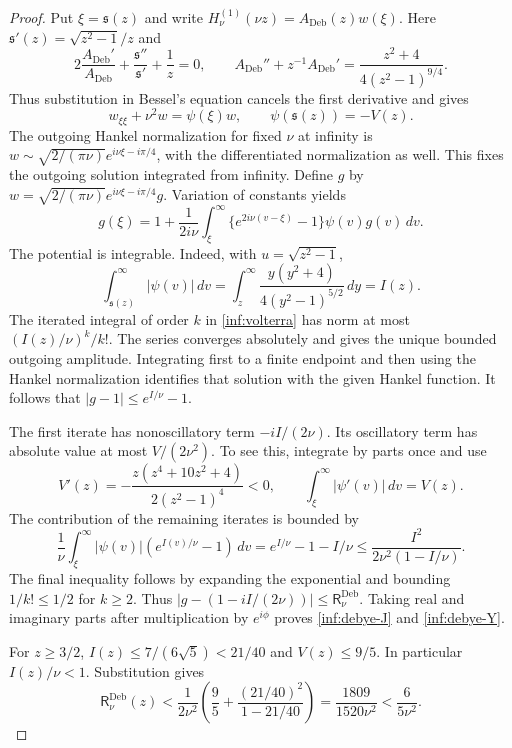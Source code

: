 \begin{proof}
Put $\xi=\mathfrak s(z)$ and write
$H_\nu^{(1)}(\nu z)=A_{\mathrm{Deb}}(z)w(\xi)$.
Here $\mathfrak s'(z)=\sqrt{z^2-1}/z$ and
\[
 2\frac{A_{\mathrm{Deb}}'}{A_{\mathrm{Deb}}}
 +\frac{\mathfrak s''}{\mathfrak s'}+\frac1z=0,
 \qquad
 A_{\mathrm{Deb}}''+z^{-1}A_{\mathrm{Deb}}'
 =\frac{z^2+4}{4(z^2-1)^{9/4}}.
\]
Thus substitution in Bessel's equation cancels the first derivative
and gives
\[
 w_{\xi\xi}+\nu^2w=\psi(\xi)w,\qquad
 \psi(\mathfrak s(z))=-V(z).
\]
The outgoing Hankel normalization for fixed $\nu$ at infinity is
$w\sim\sqrt{2/(\pi\nu)}e^{i\nu\xi-i\pi/4}$, with the differentiated
normalization as well. This fixes the outgoing solution integrated
from infinity.
Define $g$ by
$w=\sqrt{2/(\pi\nu)}e^{i\nu\xi-i\pi/4}g$. Variation of constants yields
\begin{equation}\label{inf:volterra}
 g(\xi)=1+\frac1{2i\nu}\int_\xi^\infty
       \{e^{2i\nu(v-\xi)}-1\}\psi(v)g(v)\,dv.
\end{equation}
The potential is integrable. Indeed, with $u=\sqrt{z^2-1}$,
\begin{equation}\label{inf:potential-integral}
 \int_{\mathfrak s(z)}^\infty|\psi(v)|\,dv
 =\int_z^\infty\frac{y(y^2+4)}{4(y^2-1)^{5/2}}\,dy=I(z).
\end{equation}
The iterated integral of order $k$ in \eqref{inf:volterra} has norm at
most $(I(z)/\nu)^k/k!$. The series converges absolutely and gives the
unique bounded outgoing amplitude. Integrating first to a finite
endpoint and then using the Hankel normalization identifies that
solution with the given Hankel function. It follows that
$|g-1|\le e^{I/\nu}-1$.

The first iterate has nonoscillatory term $-iI/(2\nu)$. Its oscillatory
term has absolute value at most $V/(2\nu^2)$. To see this, integrate by
parts once and use
\[
 V'(z)=-\frac{z(z^4+10z^2+4)}{2(z^2-1)^4}<0,
 \qquad
 \int_\xi^\infty|\psi'(v)|\,dv=V(z).
\]
The contribution of the remaining iterates is bounded by
\[
 \frac1\nu\int_\xi^\infty |\psi(v)|
                       (e^{I(v)/\nu}-1)\,dv
 =e^{I/\nu}-1-I/\nu
 \le\frac{I^2}{2\nu^2(1-I/\nu)}.
\]
The final inequality follows by expanding the exponential and bounding
$1/k!\le1/2$ for $k\ge2$.
Thus $|g-(1-iI/(2\nu))|\le\mathsf R_\nu^{\mathrm{Deb}}$.
Taking real and imaginary parts after multiplication by $e^{i\phi}$
proves \eqref{inf:debye-J} and \eqref{inf:debye-Y}.

For $z\ge3/2$, $I(z)\le7/(6\sqrt5)<21/40$ and $V(z)\le9/5$.
In particular $I(z)/\nu<1$. Substitution gives
\[
 \mathsf R_\nu^{\mathrm{Deb}}(z)
 <\frac1{2\nu^2}\left(\frac95+
          \frac{(21/40)^2}{1-21/40}\right)
 =\frac{1809}{1520\nu^2}<\frac6{5\nu^2}.
\]
\end{proof}

